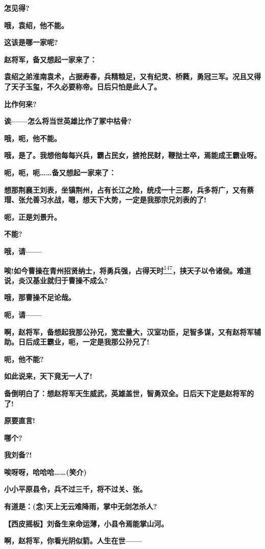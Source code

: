 \textbf{怎见得?}

\textbf{哦，袁绍，他不能。}

\textbf{这该是哪一家呢?}

\textbf{赵将军，备又想起一家来了：}

\textbf{袁绍之弟淮南袁术，占据寿春，兵精粮足，又有纪灵、桥蕤，勇冠三军。况且又得了天子玉玺，不久必要称帝。日后只怕是此人了。}

\textbf{比作何来?}

\textbf{诶------怎么将当世英雄比作了冢中枯骨?}

\textbf{哦，呃，他不能。}

\textbf{哦，是了。我想他每每兴兵，霸占民女，掳抢民财，鞭挞士卒，焉能成王霸业呀。}

\textbf{呃，呃，呃\ldots{}\ldots{}备又想起一家来了：}

\textbf{想那荆襄王刘表，坐镇荆州，占有长江之险，统戍一十三郡，兵多将广，又有蔡瑁、张允善习水战，嗯，想天下大势，一定是我那宗兄刘表的了!}

\textbf{呃，正是刘景升。}

\textbf{不能?}

\textbf{哦，请------}

\textbf{唉!如今曹操在青州招贤纳士，将勇兵强，占得天时}\protect\hyperlink{fn147}{\textsuperscript{147}}\textbf{，挟天子以令诸侯。难道说，炎汉基业就归于曹操不成么?}

\textbf{哦，那曹操不足论哉。}

\textbf{呃，请------}

\textbf{啊，赵将军，备想起我那公孙兄，宽宏量大，汉室功臣，足智多谋，又有赵将军辅助。日后成王霸业，呃，一定是我那公孙兄了!}

\textbf{呃，他不能?}

\textbf{如此说来，天下竟无一人了!}

\textbf{备倒明白了：想赵将军天生威武，英雄盖世，智勇双全。日后天下定是赵将军的了!}

\textbf{原要直言!}

\textbf{哪个?}

\textbf{我刘备?!}

\textbf{唉呀呀，哈哈哈\ldots{}\ldots{}(笑介)}

\textbf{小小平原县令，兵不过三千，将不过关、张。}

\textbf{有道是：(念)天上无云难降雨，掌中无剑怎杀人?}

\textbf{【西皮摇板】刘备生来命运薄，小县令焉能掌山河。}

\textbf{啊，赵将军，你看光阴似箭。人生在世------}

